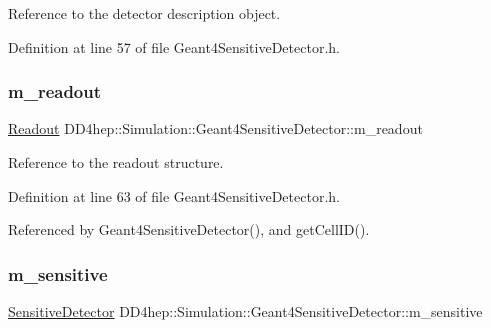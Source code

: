 Reference to the detector description object. 



Definition at line 57 of file Geant4\+Sensitive\+Detector.\+h.

\hypertarget{class_d_d4hep_1_1_simulation_1_1_geant4_sensitive_detector_a896a6c6cb7ea1a05384a0a36516da34f}{}\label{class_d_d4hep_1_1_simulation_1_1_geant4_sensitive_detector_a896a6c6cb7ea1a05384a0a36516da34f} 
\subsubsection{\texorpdfstring{m\+\_\+readout}{m\_readout}}
{\footnotesize\ttfamily \hyperlink{class_d_d4hep_1_1_geometry_1_1_readout}{Readout} D\+D4hep\+::\+Simulation\+::\+Geant4\+Sensitive\+Detector\+::m\+\_\+readout\hspace{0.3cm}{\ttfamily [protected]}}



Reference to the readout structure. 



Definition at line 63 of file Geant4\+Sensitive\+Detector.\+h.



Referenced by Geant4\+Sensitive\+Detector(), and get\+Cell\+I\+D().

\hypertarget{class_d_d4hep_1_1_simulation_1_1_geant4_sensitive_detector_a6292e7640bd34206cb682962570a6721}{}\label{class_d_d4hep_1_1_simulation_1_1_geant4_sensitive_detector_a6292e7640bd34206cb682962570a6721} 
\subsubsection{\texorpdfstring{m\+\_\+sensitive}{m\_sensitive}}
{\footnotesize\ttfamily \hyperlink{class_d_d4hep_1_1_simulation_1_1_geant4_sensitive_detector_a6375f9a4f776b531e443483ff9fa8c28}{Sensitive\+Detector} D\+D4hep\+::\+Simulation\+::\+Geant4\+Sensitive\+Detector\+::m\+\_\+sensitive\hspace{0.3cm}{\ttfamily [protected]}}



